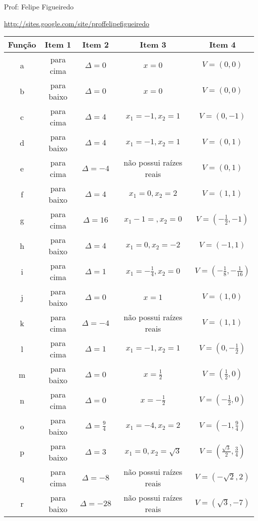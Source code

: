 \documentclass[a4paper]{article}
\begin{document}
\parbox[c]{.825\textwidth}{\raggedright%
{Prof: Felipe Figueiredo\par}
{\url{http://sites.google.com/site/proffelipefigueiredo}}

\vspace{1cm}
}

\begin{tabular}{|c|c|c|c|c|}
  \hline
  Função & Item 1 & Item 2 & Item 3 & Item 4\\
  \hline
  \hline
  a & para cima & $\Delta = 0$ & $x=0$ & $V=(0,0)$\\
  b & para baixo & $\Delta = 0$ & $x = 0$ & $V=(0,0)$\\
  c & para cima & $\Delta = 4$ & $x_1 = -1, x_2 = 1$ & $V=(0,-1)$\\
  d & para baixo & $\Delta = 4$ & $x_1 = -1,x_2 =  1$ & $V=(0,1)$\\
  e & para cima & $\Delta = -4$ & não possui raízes reais & $V=(0,1)$\\
  f & para baixo & $\Delta = 4$ & $x_1 =0, x_2 = 2$ & $V=(1,1)$\\
  g & para cima & $\Delta = 16$ & $x_1 -1= , x_2 = 0$ & $V=(-\frac{1}{2},-1)$\\
  h & para baixo & $\Delta = 4$ & $x_1 = 0, x_2 = -2$ & $V=(-1,1)$\\
  i & para cima & $\Delta = 1$ & $x_1 = -\frac{1}{4}, x_2 = 0$ & $V=(-\frac{1}{8},-\frac{1}{16})$\\
  j & para baixo & $\Delta = 0$ & $x = 1$ & $V=(1,0)$\\
  k & para cima & $\Delta = -4$ & não possui raízes reais & $V=(1,1)$\\
  l & para cima & $\Delta = 1$ & $x_1 = -1, x_2 = 1$ & $V=(0,-\frac{1}{2})$\\
  m & para baixo & $\Delta = 0$ & $x = \frac{1}{2}$ & $V=(\frac{1}{2},0)$\\
  n & para cima & $\Delta = 0$ & $x = -\frac{1}{2}$ & $V=(-\frac{1}{2},0)$\\
  o & para baixo & $\Delta = \frac{9}{4}$ & $x_1 = -4, x_2 = 2$ & $V=(-1,\frac{9}{4})$\\
  p & para baixo & $\Delta = 3$ & $x_1 = 0, x_2 = \sqrt{3}$ & $V=(\frac{\sqrt{3}}{2},\frac{3}{4})$\\
  q & para cima & $\Delta = -8$ & não possui raízes reais & $V=(-\sqrt{2},2)$\\
  r & para baixo & $\Delta = -28$ & não possui raízes reais & $V=(\sqrt{3},-7)$\\
  \hline
    

\end{tabular}


\end{document}
